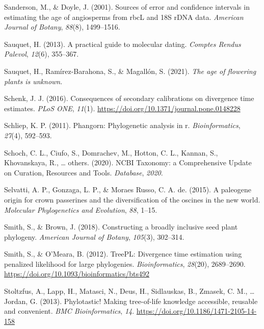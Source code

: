 \documentclass[english,man]{apa6}
\begin{document}
\leavevmode\hypertarget{ref-sanderson2001sources}{}%
Sanderson, M., \& Doyle, J. (2001). Sources of error and confidence intervals in estimating the age of angiosperms from rbcL and 18S rDNA data. \emph{American Journal of Botany}, \emph{88}(8), 1499--1516.

\leavevmode\hypertarget{ref-sauquet2013practical}{}%
Sauquet, H. (2013). A practical guide to molecular dating. \emph{Comptes Rendus Palevol}, \emph{12}(6), 355--367.

\leavevmode\hypertarget{ref-sauquet2021age}{}%
Sauquet, H., Ramírez-Barahona, S., \& Magallón, S. (2021). \emph{The age of flowering plants is unknown}.

\leavevmode\hypertarget{ref-schenk2016sec}{}%
Schenk, J. J. (2016). Consequences of secondary calibrations on divergence time estimates. \emph{PLoS ONE}, \emph{11}(1). \url{https://doi.org/10.1371/journal.pone.0148228}

\leavevmode\hypertarget{ref-schliep2011phangorn}{}%
Schliep, K. P. (2011). Phangorn: Phylogenetic analysis in r. \emph{Bioinformatics}, \emph{27}(4), 592--593.

\leavevmode\hypertarget{ref-schoch2020ncbi}{}%
Schoch, C. L., Ciufo, S., Domrachev, M., Hotton, C. L., Kannan, S., Khovanskaya, R., \ldots{} others. (2020). NCBI Taxonomy: a Comprehensive Update on Curation, Resources and Tools. \emph{Database}, \emph{2020}.

\leavevmode\hypertarget{ref-selvatti2015paleogene}{}%
Selvatti, A. P., Gonzaga, L. P., \& Moraes Russo, C. A. de. (2015). A paleogene origin for crown passerines and the diversification of the oscines in the new world. \emph{Molecular Phylogenetics and Evolution}, \emph{88}, 1--15.

\leavevmode\hypertarget{ref-smith2018constructing}{}%
Smith, S., \& Brown, J. (2018). Constructing a broadly inclusive seed plant phylogeny. \emph{American Journal of Botany}, \emph{105}(3), 302--314.

\leavevmode\hypertarget{ref-Smith2012}{}%
Smith, S., \& O'Meara, B. (2012). TreePL: Divergence time estimation using penalized likelihood for large phylogenies. \emph{Bioinformatics}, \emph{28}(20), 2689--2690. \url{https://doi.org/10.1093/bioinformatics/bts492}

\leavevmode\hypertarget{ref-Stoltzfus2013}{}%
Stoltzfus, A., Lapp, H., Matasci, N., Deus, H., Sidlauskas, B., Zmasek, C. M., \ldots{} Jordan, G. (2013). Phylotastic! Making tree-of-life knowledge accessible, reusable and convenient. \emph{BMC Bioinformatics}, \emph{14}. \url{https://doi.org/10.1186/1471-2105-14-158}
\end{document}
